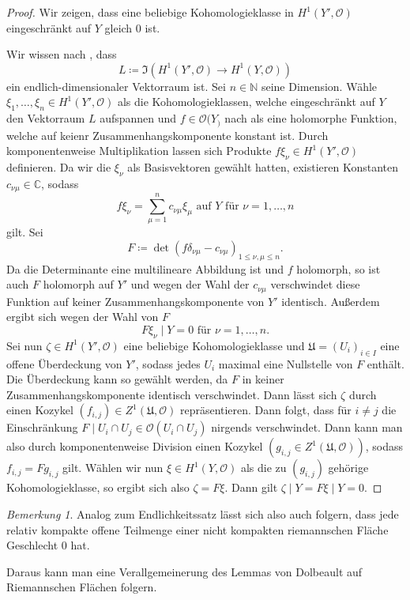 \documentclass[11pt,a4paper,toc=bibliography]{scrartcl}
\theoremstyle{thm}
\theoremstyle{def}
\theoremstyle{remark}
\newtheorem*{bem}{Bemerkung}
\begin{document}
\begin{proof}
	Wir zeigen, dass eine beliebige Kohomologieklasse in $H^1(Y',\mathcal{O})$ eingeschränkt auf $Y$ gleich $0$ ist.
	
	Wir wissen nach , dass 
	\[L\coloneqq \Im\left(H^1(Y',\mathcal{O})\rightarrow H^1(Y,\mathcal{O})\right)\]
	ein endlich-dimensionaler Vektorraum ist. Sei $n\in\mathbb{N}$ seine Dimension. Wähle $\xi_1,\ldots,\xi_n\in H^1(Y',\mathcal{O})$ als die Kohomologieklassen, welche eingeschränkt auf $Y$ den Vektorraum $L$ aufspannen und $f\in\mathcal{O}(Y_)$ nach  als eine holomorphe Funktion, welche auf keienr Zusammenhangskomponente konstant ist. Durch komponentenweise Multiplikation lassen sich Produkte $f\xi_\nu\in H^1(Y',\mathcal{O})$ definieren. Da wir die $\xi_\nu$ als Basisvektoren gewählt hatten, existieren Konstanten $c_{\nu\mu}\in\mathbb{C}$, sodass
	\[f\xi_\nu =\sum_{\mu=1}^n c_{\nu\mu}\xi_\mu \text{ auf } Y\text{ für } \nu=1,\ldots,n\]
	gilt. Sei
	\[
	F\coloneqq \det (f\delta_{\nu\mu}-c_{\nu\mu})_{1\leq\nu,\mu\leq n}.
	\]
	Da die Determinante eine multilineare Abbildung ist und $f$ holomorph, so ist auch $F$ holomorph auf $Y'$ und wegen der Wahl der $c_{\nu\mu}$ verschwindet diese Funktion auf keiner Zusammenhangskomponente von $Y'$ identisch. Außerdem ergibt sich wegen der Wahl von $F$
	\[
	F\xi_\nu\mid Y = 0\text{ für } \nu=1,\ldots,n.
	\]
	Sei nun $\zeta\in H^1(Y',\mathcal{O})$ eine beliebige Kohomologieklasse und $\mathfrak{U}=(U_i)_{i\in I}$ eine offene Überdeckung von $Y'$, sodass jedes $U_i$ maximal eine Nullstelle von $F$ enthält. Die Überdeckung kann so gewählt werden, da $F$ in keiner Zusammenhangskomponente identisch verschwindet. Dann lässt sich $\zeta$ durch einen Kozykel $(f_{i,j})\in Z^1(\mathfrak{U},\mathcal{O})$ repräsentieren.
	Dann folgt, dass für $i\neq j$ die Einschränkung $F\mid U_i\cap U_j\in \mathcal{O}(U_i\cap U_j)$ nirgends verschwindet. Dann kann man also durch komponentenweise Division einen Kozykel $(g_{i,j}\in Z^1(\mathfrak{U},\mathcal{O}))$, sodass $f_{i,j}=Fg_{i,j}$ gilt. 
	Wählen wir nun $\xi\in H^1(Y,\mathcal{O})$ als die zu $(g_{i,j})$ gehörige Kohomologieklasse, so ergibt sich also $\zeta =F\xi$. Dann gilt
	$\zeta\mid Y = F\xi\mid Y =0$.
	\end{proof}
\begin{bem}
Analog zum Endlichkeitssatz lässt sich also auch folgern, dass jede relativ kompakte offene Teilmenge einer nicht kompakten riemannschen Fläche Geschlecht 0 hat.
\end{bem}
Daraus kann man eine Verallgemeinerung des Lemmas von Dolbeault auf Riemannschen Flächen\cite[S.97,13.2]{forster} folgern.
\end{document}
